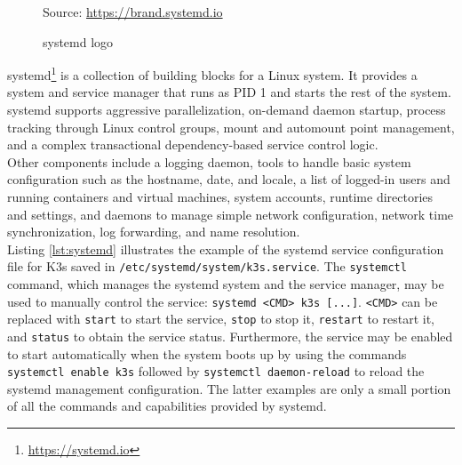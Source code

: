 \begin{figure} %
  \centering
  \def\stackalignment{r} %
  {\scriptsize \parbox[t]{\linewidth}{ Source: \url{https://brand.systemd.io}} }
  \caption{systemd logo}
\end{figure}

systemd\footnote{\url{https://systemd.io}} is a collection of building blocks
for a Linux system. It provides a system and service manager that runs as PID 1 and
starts the rest of the system. \\ %
systemd supports aggressive parallelization, on-demand daemon startup, process tracking
through Linux control groups, mount and automount point management, and a complex
transactional dependency-based service control logic. \\ %
Other components include a logging daemon, tools to handle basic system
configuration such as the hostname, date, and locale, a list of logged-in users and
running containers and virtual machines, system accounts, runtime directories and
settings, and daemons to manage simple network configuration, network time synchronization,
log forwarding, and name resolution. \\ %
Listing \ref{lst:systemd} illustrates the example of the systemd service configuration
file for K3s saved in \texttt{/etc/systemd/system/k3s.service}. The \texttt{systemctl}
command, which manages the systemd system and the service manager, may be used to
manually control the service: \texttt{systemd <CMD> k3s [...]}. \texttt{<CMD>} can
be replaced with \texttt{start} to start the service, \texttt{stop} to stop it, \texttt{restart}
to restart it, and \texttt{status} to obtain the service status. Furthermore,
the service may be enabled to start automatically when the system boots up by
using the commands \texttt{systemctl enable k3s} followed by \texttt{systemctl daemon-reload}
to reload the systemd management configuration. The latter examples are only a small
portion of all the commands and capabilities provided by systemd.

